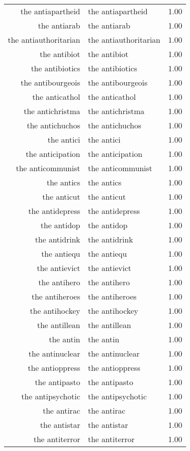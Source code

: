 \begin{table}[ht]
\begin{tabular}{rlr}
  the antiapartheid & the antiapartheid & 1.00 \\ 
  the antiarab & the antiarab & 1.00 \\ 
  the antiauthoritarian & the antiauthoritarian & 1.00 \\ 
  the antibiot & the antibiot & 1.00 \\ 
  the antibiotics & the antibiotics & 1.00 \\ 
  the antibourgeois & the antibourgeois & 1.00 \\ 
  the anticathol & the anticathol & 1.00 \\ 
  the antichristma & the antichristma & 1.00 \\ 
  the antichuchos & the antichuchos & 1.00 \\ 
  the antici & the antici & 1.00 \\ 
  the anticipation & the anticipation & 1.00 \\ 
  the anticommunist & the anticommunist & 1.00 \\ 
  the antics & the antics & 1.00 \\ 
  the anticut & the anticut & 1.00 \\ 
  the antidepress & the antidepress & 1.00 \\ 
  the antidop & the antidop & 1.00 \\ 
  the antidrink & the antidrink & 1.00 \\ 
  the antiequ & the antiequ & 1.00 \\ 
  the antievict & the antievict & 1.00 \\ 
  the antihero & the antihero & 1.00 \\ 
  the antiheroes & the antiheroes & 1.00 \\ 
  the antihockey & the antihockey & 1.00 \\ 
  the antillean & the antillean & 1.00 \\ 
  the antin & the antin & 1.00 \\ 
  the antinuclear & the antinuclear & 1.00 \\ 
  the antioppress & the antioppress & 1.00 \\ 
  the antipasto & the antipasto & 1.00 \\ 
  the antipsychotic & the antipsychotic & 1.00 \\ 
  the antirac & the antirac & 1.00 \\ 
  the antistar & the antistar & 1.00 \\ 
  the antiterror & the antiterror & 1.00 \\ 

\end{tabular}
\end{table}
